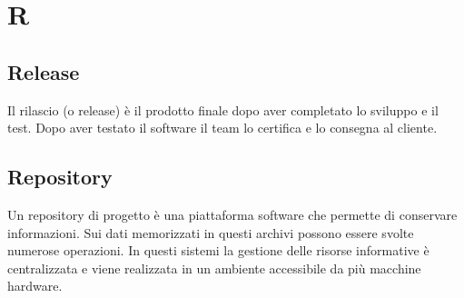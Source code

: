 \section{R}
 \subsection{Release}
 Il rilascio (o release) è il prodotto finale dopo aver completato lo sviluppo e il test. Dopo aver testato il software il team lo certifica e lo consegna al cliente.
 
 \subsection{Repository}
 Un repository di progetto è una piattaforma software che permette di conservare informazioni. Sui dati memorizzati in questi archivi possono essere svolte numerose operazioni. In questi sistemi la gestione delle risorse informative è centralizzata e viene realizzata in un ambiente accessibile da più macchine hardware.
 
\clearpage